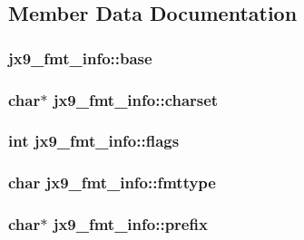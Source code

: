 \subsection{Member Data Documentation}
\hypertarget{structjx9__fmt__info_a9207082aac5e981e5875b26e896e0e16}{
\subsubsection[{base}]{ jx9\-\_\-fmt\-\_\-info\-::base}}\label{d2/da5/structjx9__fmt__info_a9207082aac5e981e5875b26e896e0e16}
\hypertarget{structjx9__fmt__info_a7e23a34d89e8571ceb12b53b70a825bb}{
\subsubsection[{charset}]{\setlength{\rightskip}{0pt plus 5cm}char$\ast$ jx9\-\_\-fmt\-\_\-info\-::charset}}\label{d2/da5/structjx9__fmt__info_a7e23a34d89e8571ceb12b53b70a825bb}
\hypertarget{structjx9__fmt__info_a2aa747213f64c62d2c7edb7723be1272}{
\subsubsection[{flags}]{\setlength{\rightskip}{0pt plus 5cm}int jx9\-\_\-fmt\-\_\-info\-::flags}}\label{d2/da5/structjx9__fmt__info_a2aa747213f64c62d2c7edb7723be1272}
\hypertarget{structjx9__fmt__info_a6ac1954686f804b313d2face6ac7571d}{
\subsubsection[{fmttype}]{\setlength{\rightskip}{0pt plus 5cm}char jx9\-\_\-fmt\-\_\-info\-::fmttype}}\label{d2/da5/structjx9__fmt__info_a6ac1954686f804b313d2face6ac7571d}
\hypertarget{structjx9__fmt__info_ad67c45c02641db801d0695330cc254f1}{
\subsubsection[{prefix}]{\setlength{\rightskip}{0pt plus 5cm}char$\ast$ jx9\-\_\-fmt\-\_\-info\-::prefix}}\label{d2/da5/structjx9__fmt__info_ad67c45c02641db801d0695330cc254f1}
